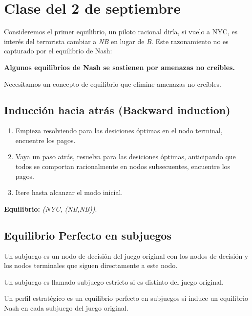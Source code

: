 \documentclass[letterpaper,12pt,twocolumn]{report}
\begin{document}
\section{Clase del 2 de septiembre}

Consideremos el primer equilibrio, un piloto racional diría, si vuelo a NYC, es interés del terrorista cambiar a \textit{NB} en lugar de \textit{B}. Este razonamiento no es capturado por el equilibrio de Nash:

\begin{center}
\noindent \textbf{Algunos equilibrios de Nash se sostienen por amenazas no creíbles.}
\end{center}

Necesitamos un concepto de equilibrio que elimine amenazas no creíbles.

\subsection*{Inducción hacia atrás (Backward induction)}

\begin{enumerate}
	\item Empieza resolviendo para las desiciones óptimas en el nodo terminal, encuentre los pagos.
	\item Vaya un paso atrás, resuelva para las desiciones óptimas, anticipando que todos se comportan racionalmente en nodos subsecuentes, encuentre los pagos.
	\item Itere hasta alcanzar el modo inicial.
\end{enumerate}



\textbf{Equilibrio:} \textit{(NYC, (NB,NB))}.

\subsection*{Equilibrio Perfecto en subjuegos}

\begin{tcolorbox}[title=Definición]
	Un subjuego es un nodo de decisión del juego original con los nodos de decisión y los nodos terminales que siguen directamente a este nodo.
\end{tcolorbox}

Un subjuego es llamado subjuego estricto si es distinto del juego original.

\begin{tcolorbox}[title=Definición]

Un perfil estratégico es un equilibrio perfecto en subjuegos si induce un equilibrio Nash en cada subjuego del juego original.

\end{tcolorbox}
\end{document}
